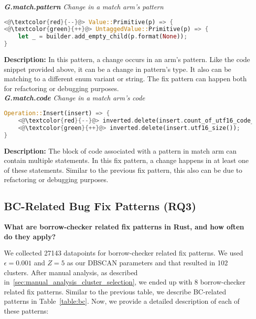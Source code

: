 \noindent\textit{\textbf{G.match.pattern} Change in a match arm's pattern}

\begin{lstlisting}[language=Rust, style=colouredRust]
<@\textcolor{red}{--}@> Value::Primitive(p) => {
<@\textcolor{green}{++}@> UntaggedValue::Primitive(p) => {
    let _ = builder.add_empty_child(p.format(None));
}
\end{lstlisting}

\noindent\textbf{Description:} In this pattern, a change occurs in an arm's pattern. Like the code snippet provided above, it can be a change in pattern's type. It also can be matching to a different enum variant or string. The fix pattern can happen both for refactoring or debugging purposes. \\

\noindent\textit{\textbf{G.match.code} Change in a match arm's code}

\begin{lstlisting}[language=Rust, style=colouredRust]
Operation::Insert(insert) => {
    <@\textcolor{red}{--}@> inverted.delete(insert.count_of_utf16_code_units());
    <@\textcolor{green}{++}@> inverted.delete(insert.utf16_size());
}
\end{lstlisting}

\noindent\textbf{Description:} The block of code associated with a pattern in match arm can contain multiple statements. In this fix pattern, a change happens in at least one of these statements. Similar to the previous fix pattern, this also can be due to refactoring or debugging purposes.

\subsection{\label{sec:bc_patterns}BC-Related Bug Fix Patterns (RQ3)}

\textbf{What are borrow-checker related fix patterns in Rust, and how often do they apply?} 

We collected 27143 datapoints for borrow-checker related fix patterns. We used $\epsilon=0.001$ and $Z=5$ as our DBSCAN parameters and that resulted in 102 clusters. After manual analysis, as described in~\ref{sec:manual_analysis_cluster_selection}, we ended up with 8 borrow-checker related fix patterns. Similar to the previous table, we describe BC-related patterns in Table~\ref{table:bc}. Now, we provide a detailed description of each of these patterns:

